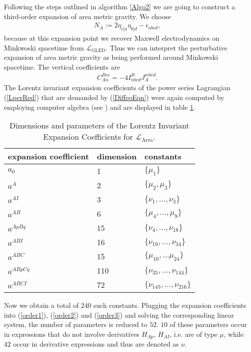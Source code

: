 \documentclass[%
preprint,
titlepage,
nofootinbib,
amsmath,amssymb,
showkeys,
aps,
prd,
floatfix,
]{revtex4-2}
\begin{document}
Following the steps outlined in algorithm \ref{Algo2}
we are going to construct a third-order expansion of area metric gravity.
We choose
\begin{align}
N_A := 2 \eta_{c[a} \eta_{b]d} - \epsilon_{abcd},
\end{align}
because at this expansion point we recover Maxwell electrodynamics on Minkwoski spacetime from $\mathcal{L}_{\text{GLED}}$.
Thus we can interpret the perturbative expansion of area metric gravity as being performed around Minkowski spacetime.
The vertical coefficients are
\begin{align}\label{areaGotayMInter}
    C_{An}^{Bm} = -4 I^B_{nbcd} J_A^{mbcd}.
\end{align}
The Lorentz invariant expansion coefficients of the power series Lagrangian (\ref{LperRed}) that are demanded by (\ref{DiffeoEqn}) were again computed by employing computer algebra (see \cite{sparse-tensor}) and are displayed in table \ref{AreaExp}.
\begin{table}
\centering 
\begin{tabular}{lll} \toprule
    expansion coefficient & dimension & constants   \\ \midrule
    $a_0$ & 1 & $\{\mu_1\}$ \\
    $a^A$ & 2 & $\{\mu_2,\mu_3\}$ \\
    $a^{AI}$ & 3 & $\{\nu_1,..., \nu_3\}$ \\
    $a^{AB}$ & 6 & $\{\mu_4,..., \mu_9 \} $ \\
    $a^{ApBq}$ & 15 & $\{\nu_4,...,\nu_{18}\}$ \\
    $a^{ABI}$ & 16 & $\{ \nu_{19},...,\nu_{34} \}$ \\
    $a^{ABC}$ & 15 & $\{ \mu_{10},...\mu_{24} \}$\\
    $a^{ABpCq}$ & 110 & $\{\nu_{35},...,\nu_{144} \}$ \\
    $a^{ABCI}$ & 72 & $\{ \nu_{145},...,\nu_{216}\}$ \\ \bottomrule
\end{tabular}
\caption{Dimensions and parameters of the Lorentz Invariant Expansion Coefficients for $\mathcal{L}_{\text{Area}}$.}\label{AreaExp}
\end{table}
Now we obtain a total of $240$ such constants. Plugging the expansion coefficients into (\ref{order1}), (\ref{order2}) and (\ref{order3}) and solving the corresponding linear system, the number of parameters is reduced to $52$. $10$ of these parameters occur in expressions that do not involve derivatives $H_{Ap}$, $H_{AI}$, i.e. are of type $\mu$, while $42$ occur in derivative expressions and thus are denoted as $\nu$.
\end{document}
